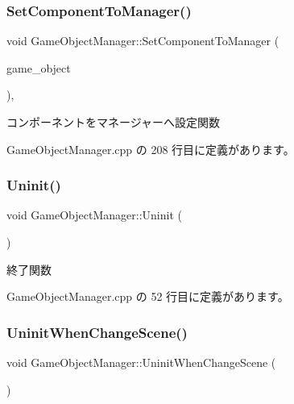 \subsubsection{\texorpdfstring{Set\+Component\+To\+Manager()}{SetComponentToManager()}}
{\footnotesize\ttfamily void Game\+Object\+Manager\+::\+Set\+Component\+To\+Manager (\begin{DoxyParamCaption}\item[{\mbox{\hyperlink{class_game_object_base}{Game\+Object\+Base}} $\ast$}]{game\+\_\+object }\end{DoxyParamCaption})\hspace{0.3cm}{\ttfamily [static]}, {\ttfamily [private]}}



コンポーネントをマネージャーへ設定関数 



 Game\+Object\+Manager.\+cpp の 208 行目に定義があります。

\mbox{\label{class_game_object_manager_a4d2cb0e07fddeea160e64f6e1d2a326a}} 
\subsubsection{\texorpdfstring{Uninit()}{Uninit()}}
{\footnotesize\ttfamily void Game\+Object\+Manager\+::\+Uninit (\begin{DoxyParamCaption}{ }\end{DoxyParamCaption})\hspace{0.3cm}{\ttfamily [static]}}



終了関数 



 Game\+Object\+Manager.\+cpp の 52 行目に定義があります。

\mbox{\label{class_game_object_manager_ad962739b2c2f54d4160c3513132930da}} 
\subsubsection{\texorpdfstring{Uninit\+When\+Change\+Scene()}{UninitWhenChangeScene()}}
{\footnotesize\ttfamily void Game\+Object\+Manager\+::\+Uninit\+When\+Change\+Scene (\begin{DoxyParamCaption}{ }\end{DoxyParamCaption})\hspace{0.3cm}{\ttfamily [static]}}



